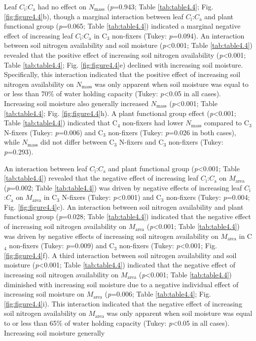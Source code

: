 Leaf $C_\mathrm{i}$:$C_\mathrm{a}$ had no effect on $N_\mathrm{mass}$ (\textit{p}=0.943; Table \ref{tab:table4.4}; Fig. \ref{fig:figure4.4}b), though a marginal interaction between leaf $C_\mathrm{i}$:$C_\mathrm{a}$ and plant functional group (\textit{p}=0.065; Table \ref{tab:table4.4}) indicated a marginal negative effect of increasing leaf $C_\mathrm{i}$:$C_\mathrm{a}$ in C$_3$ non-fixers (Tukey: \textit{p}=0.094). An interaction between soil nitrogen availability and soil moisture (\textit{p}<0.001; Table \ref{tab:table4.4}) revealed that the positive effect of increasing soil nitrogen availability (\textit{p}<0.001; Table \ref{tab:table4.4}; Fig. \ref{fig:figure4.4}e) declined with increasing soil moisture. Specifically, this interaction indicated that the positive effect of increasing soil nitrogen availability on $N_\mathrm{mass}$ was only apparent when soil moisture was equal to or less than 70\% of water holding capacity (Tukey: \textit{p}<0.05 in all cases). Increasing soil moisture also generally increased $N_\mathrm{mass}$ (\textit{p}<0.001; Table \ref{tab:table4.4}; Fig. \ref{fig:figure4.4}h). A plant functional group effect (\textit{p}<0.001; Table \ref{tab:table4.4}) indicated that C$_4$ non-fixers had lower $N_\mathrm{mass}$ compared to C$_3$ N-fixers (Tukey: \textit{p}=0.006) and C$_3$ non-fixers (Tukey: \textit{p}=0.026 in both cases), while $N_\mathrm{mass}$ did not differ between C$_3$ N-fixers and C$_3$ non-fixers (Tukey: \textit{p}=0.293).

An interaction between leaf $C_\mathrm{i}$:$C_\mathrm{a}$ and plant functional group (\textit{p}<0.001; Table \ref{tab:table4.4}) revealed that the negative effect of increasing leaf $C_\mathrm{i}$:$C_\mathrm{a}$ on $M_\mathrm{area}$ (\textit{p}=0.002; Table \ref{tab:table4.4}) was driven by negative effects of increasing leaf $C_\mathrm{i}$:$C_\mathrm{a}$ on $M_\mathrm{area}$ in C$_3$ N-fixers (Tukey: \textit{p}<0.001) and C$_3$ non-fixers (Tukey: \textit{p}=0.004; Fig. \ref{fig:figure4.4}c). An interaction between soil nitrogen availability and plant functional group (\textit{p}=0.028; Table \ref{tab:table4.4}) indicated that the negative effect of increasing soil nitrogen availability on $M_\mathrm{area}$ (\textit{p}<0.001; Table \ref{tab:table4.4}) was driven by negative effects of increasing soil nitrogen availability on $M_\mathrm{area}$ in C$_4$ non-fixers (Tukey: \textit{p}=0.009) and C$_3$ non-fixers (Tukey: \textit{p}<0.001; Fig. \ref{fig:figure4.4}f). A third interaction between soil nitrogen availability and soil moisture (\textit{p}<0.001; Table \ref{tab:table4.4}) indicated that the negative effect of increasing soil nitrogen availability on $M_\mathrm{area}$ (\textit{p}<0.001; Table \ref{tab:table4.4}) diminished with increasing soil moisture due to a negative individual effect of increasing soil moisture on $M_\mathrm{area}$ (\textit{p}=0.006; Table \ref{tab:table4.4}; Fig. \ref{fig:figure4.4}i). This interaction indicated that the negative effect of increasing soil nitrogen availability on $M_\mathrm{area}$ was only apparent when soil moisture was equal to or less than 65\% of water holding capacity (Tukey: \textit{p}<0.05 in all cases). Increasing soil moisture generally 

